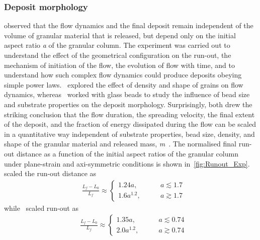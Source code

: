 \subsubsection{Deposit morphology}
\citet{Lajeunesse2005} observed that the flow dynamics and the final deposit 
remain independent of the volume of granular material that is released, but 
depend only on the initial aspect ratio \textit{a} of the granular column. 
The experiment was carried out to understand the effect of the geometrical 
configuration on the run-out, the mechanism of initiation of the flow, the 
evolution of flow with time, and to understand how such complex flow dynamics 
could produce deposits obeying simple power laws.~\citet{Lube2005} explored the 
effect of density and shape of grains on flow dynamics, 
whereas~\citet{Lajeunesse2004} worked with glass beads to study the influence 
of bead size and substrate properties on the deposit morphology. Surprisingly, 
both drew the striking conclusion that the flow duration, the spreading 
velocity, the final extent of the deposit, and the fraction of energy 
dissipated during the flow can be scaled in a quantitative way independent of 
substrate properties, bead size, density, and shape of the granular material 
and released mass, \textit{m}~\citep{Lajeunesse2005}. The normalised final 
run-out distance as a function of the initial aspect ratios of the granular 
column under plane-strain and axi-symmetric conditions is 
shown in~\cref{fig:Runout_Exp}.~\citet{Lube2005} scaled the run-out distance as
\begin{align}
& \frac{\textit{L}_{\textit{f}}- 
\textit{L}_{\textit{0}}}{\textit{L}_{\textit{f}}} \approx
\begin{cases} 
1.24\textit{a}, \qquad &\textit{a} \lesssim 1.7 \\
1.6\textit{a}^{1.2}, \qquad &\textit{a} \gtrsim 1.7
\end{cases}
\end{align}
while~\citet{Lajeunesse2004} scaled run-out as
\begin{align}
& \frac{\textit{L}_{\textit{f}}- 
\textit{L}_{\textit{0}}}{\textit{L}_{\textit{f}}} \approx
\begin{cases} 
1.35\textit{a}, \qquad &\textit{a} \lesssim 0.74 \\
2.0\textit{a}^{1.2}, \qquad &\textit{a} \gtrsim 0.74
\end{cases}
\end{align} 

